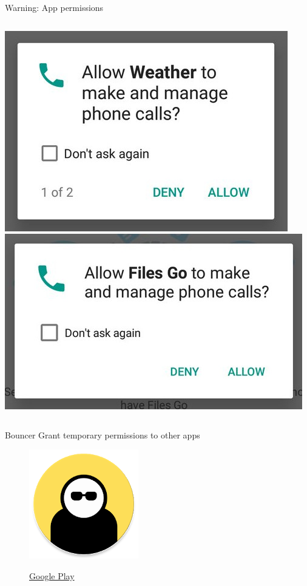 \documentclass[serif,14pt,color=usenames,dvipsnames]{beamer}
\begin{document}
\begin{frame}{Warning: App permissions}

  \begin{columns}
      \centering
      \includegraphics[width=\linewidth]{imgs/weather}
      \centering
      \includegraphics[width=\linewidth]{imgs/filesgo}
  \end{columns}
\end{frame}

\begin{frame}{Bouncer}
  Grant temporary permissions to other apps

  \begin{figure}
  \centering
  \includegraphics[width=0.4\linewidth]{imgs/bouncer}

  \href{https://play.google.com/store/apps/details?id=com.samruston.permission}{Google
  Play }
  \end{figure}

\end{frame}

\begin{frame}
\maketitle
\end{frame}
\end{document}
